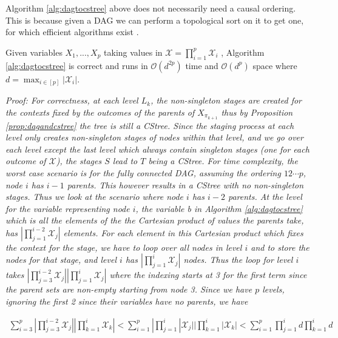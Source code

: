 \documentclass{tufte-book}
\begin{document}
\begin{Definition}
Algorithm \ref{alg:dagtocstree} above does not necessarily need a causal ordering. This is because given a DAG we can perform a topological sort on it to get one, for which efficient algorithms exist \cite{tarjan-1976-edge-disjoin}.

\begin{theorem}\label{thm:dagtocstreecorrectness}
Given variables $X_1,...,X_p$ taking values in $\mathcal{X}=\prod_{i=1}^p \mathcal{X}_i$ , Algorithm \ref{alg:dagtocstree} is correct and runs in $\mathcal{O}(d^{2p})$ time and $\mathcal{O}(d^p)$ space where $d = \max_{i \in [p]} |\mathcal{X}_i|$.
\end{theorem}

\textit{Proof:
	For correctness, at each level $L_k$, the non-singleton stages are created for the contexts fixed by the outcomes of the parents of $X_{\pi_{k+1}}$ thus by Proposition \ref{prop:dagandcstree} the tree is still a CStree. Since the staging process at each level only creates non-singleton stages of nodes within that level, and we go over each level except the last level which always contain singleton stages (one for each outcome of $\mathcal{X}$), the stages $S$ lead to $T$ being a CStree. For time complexity, the worst case scenario is for the fully connected DAG, assuming the ordering $12\cdots p$, node $i$ has $i-1$ parents. This however results in a CStree with no non-singleton stages. Thus we look at the scenario where node $i$ has $i-2$ parents. At the level for the variable representing node $i$, the variable b in Algorithm \ref{alg:dagtocstree} which is all the elements of the the Cartesian product of values the parents take, has $|\prod_{j=1}^{i-2} \mathcal{X}_j|$ elements. For each element in this Cartesian product which fixes the context for the stage, we have to loop over all nodes in level $i$ and to store the nodes for that stage, and level $i$ has $|\prod_{j=1}^i \mathcal{X}_j|$ nodes. Thus the loop for level $i$ takes $|\prod_{j=3}^{i-2} \mathcal{X}_j ||\prod_{j=1}^i \mathcal{X}_j| $ where the indexing starts at 3 for the first term since the parent sets are non-empty starting from node 3. Since we have $p$ levels, ignoring the first 2 since their variables have no parents, we have}

	\begin{align*}\sum_{i=3}^p |\prod_{j=3}^{i-2} \mathcal{X}_j ||\prod_{k=1}^i \mathcal{X}_k| < \sum_{i=1}^p |\prod_{j=1}^i |\mathcal{X}_j||\prod_{k=1}^i |\mathcal{X}_k|< \sum_{i=1}^p \prod_{j=1}^i d \prod_{k=1}^i d 
	\end{align*}


\end{Definition}
\end{document}
